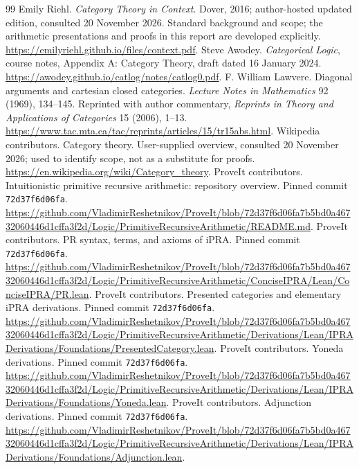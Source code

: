 \begin{thebibliography}{99}
 Emily Riehl. \emph{Category Theory in Context}. Dover, 2016; author-hosted updated edition, consulted 20 November 2026. Standard background and scope; the arithmetic presentations and proofs in this report are developed explicitly. \url{https://emilyriehl.github.io/files/context.pdf}.
 Steve Awodey. \emph{Categorical Logic}, course notes, Appendix A: Category Theory, draft dated 16 January 2024. \url{https://awodey.github.io/catlog/notes/catlog0.pdf}.
 F. William Lawvere. Diagonal arguments and cartesian closed categories. \emph{Lecture Notes in Mathematics} 92 (1969), 134--145. Reprinted with author commentary, \emph{Reprints in Theory and Applications of Categories} 15 (2006), 1--13. \url{https://www.tac.mta.ca/tac/reprints/articles/15/tr15abs.html}.
 Wikipedia contributors. Category theory. User-supplied overview, consulted 20 November 2026; used to identify scope, not as a substitute for proofs. \url{https://en.wikipedia.org/wiki/Category_theory}.
 ProveIt contributors. Intuitionistic primitive recursive arithmetic: repository overview. Pinned commit \texttt{72d37f6d06fa}. \url{https://github.com/VladimirReshetnikov/ProveIt/blob/72d37f6d06fa7b5bd0a46732060446d1cffa3f2d/Logic/PrimitiveRecursiveArithmetic/README.md}.
 ProveIt contributors. PR syntax, terms, and axioms of iPRA. Pinned commit \texttt{72d37f6d06fa}. \url{https://github.com/VladimirReshetnikov/ProveIt/blob/72d37f6d06fa7b5bd0a46732060446d1cffa3f2d/Logic/PrimitiveRecursiveArithmetic/ConciseIPRA/Lean/ConciseIPRA/PR.lean}.
 ProveIt contributors. Presented categories and elementary iPRA derivations. Pinned commit \texttt{72d37f6d06fa}. \url{https://github.com/VladimirReshetnikov/ProveIt/blob/72d37f6d06fa7b5bd0a46732060446d1cffa3f2d/Logic/PrimitiveRecursiveArithmetic/Derivations/Lean/IPRADerivations/Foundations/PresentedCategory.lean}.
 ProveIt contributors. Yoneda derivations. Pinned commit \texttt{72d37f6d06fa}. \url{https://github.com/VladimirReshetnikov/ProveIt/blob/72d37f6d06fa7b5bd0a46732060446d1cffa3f2d/Logic/PrimitiveRecursiveArithmetic/Derivations/Lean/IPRADerivations/Foundations/Yoneda.lean}.
 ProveIt contributors. Adjunction derivations. Pinned commit \texttt{72d37f6d06fa}. \url{https://github.com/VladimirReshetnikov/ProveIt/blob/72d37f6d06fa7b5bd0a46732060446d1cffa3f2d/Logic/PrimitiveRecursiveArithmetic/Derivations/Lean/IPRADerivations/Foundations/Adjunction.lean}.

\end{thebibliography}
